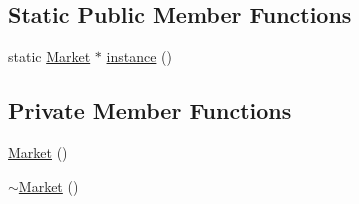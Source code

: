 \subsection*{Static Public Member Functions}
\begin{DoxyCompactItemize}
\item 
static \hyperlink{class_market}{Market} $\ast$ \hyperlink{class_market_ab55699aa5df4c8c7a6085cdd3ddc9b38}{instance} ()
\end{DoxyCompactItemize}
\subsection*{Private Member Functions}
\begin{DoxyCompactItemize}
\item 
\hyperlink{class_market_aceddb4e7d1f53bc1e3a4f10b2254437f}{Market} ()
\item 
\hyperlink{class_market_affb37a82b0eb904290c6dbbf6736524c}{$\sim$\+Market} ()
\end{DoxyCompactItemize}
